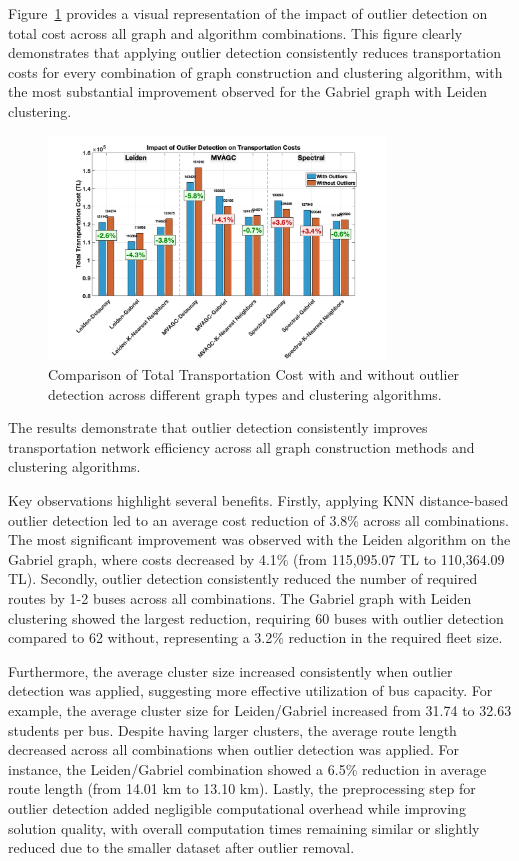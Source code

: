 Figure~\ref{fig:outlier_cost_comparison} provides a visual representation of the impact of outlier detection on total cost across all graph and algorithm combinations. This figure clearly demonstrates that applying outlier detection consistently reduces transportation costs for every combination of graph construction and clustering algorithm, with the most substantial improvement observed for the Gabriel graph with Leiden clustering.

\begin{figure}[h]
    \centering
    \includegraphics[width=0.8\textwidth]{img/outlier_cost_comparison}
    \caption{Comparison of Total Transportation Cost with and without outlier detection across different graph types and clustering algorithms.}
    \label{fig:outlier_cost_comparison}
\end{figure}


The results demonstrate that outlier detection consistently improves transportation network efficiency across all graph construction methods and clustering algorithms.

Key observations highlight several benefits. Firstly, applying KNN distance-based outlier detection led to an average cost reduction of 3.8\% across all combinations. The most significant improvement was observed with the Leiden algorithm on the Gabriel graph, where costs decreased by 4.1\% (from 115,095.07 TL to 110,364.09 TL). Secondly, outlier detection consistently reduced the number of required routes by 1-2 buses across all combinations. The Gabriel graph with Leiden clustering showed the largest reduction, requiring 60 buses with outlier detection compared to 62 without, representing a 3.2\% reduction in the required fleet size.

Furthermore, the average cluster size increased consistently when outlier detection was applied, suggesting more effective utilization of bus capacity. For example, the average cluster size for Leiden/Gabriel increased from 31.74 to 32.63 students per bus. Despite having larger clusters, the average route length decreased across all combinations when outlier detection was applied. For instance, the Leiden/Gabriel combination showed a 6.5\% reduction in average route length (from 14.01 km to 13.10 km). Lastly, the preprocessing step for outlier detection added negligible computational overhead while improving solution quality, with overall computation times remaining similar or slightly reduced due to the smaller dataset after outlier removal.


